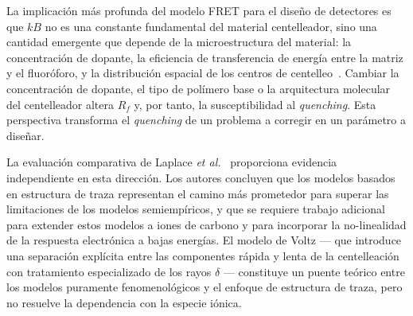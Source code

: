 \documentclass[11pt,a4paper]{article}
\begin{document}
La implicación más profunda del modelo FRET para el diseño de detectores es que $kB$ no es una constante fundamental del material centelleador, sino una cantidad emergente que depende de la microestructura del material: la concentración de dopante, la eficiencia de transferencia de energía entre la matriz y el fluoróforo, y la distribución espacial de los centros de centelleo~\cite{ogawa2018}. Cambiar la concentración de dopante, el tipo de polímero base o la arquitectura molecular del centelleador altera $R_f$ y, por tanto, la susceptibilidad al \textit{quenching}. Esta perspectiva transforma el \textit{quenching} de un problema a corregir en un parámetro a diseñar.

La evaluación comparativa de Laplace \textit{et al.}~\cite{laplace2022} proporciona evidencia independiente en esta dirección. Los autores concluyen que los modelos basados en estructura de traza representan el camino más prometedor para superar las limitaciones de los modelos semiempíricos, y que se requiere trabajo adicional para extender estos modelos a iones de carbono y para incorporar la no-linealidad de la respuesta electrónica a bajas energías. El modelo de Voltz --- que introduce una separación explícita entre las componentes rápida y lenta de la centelleación con tratamiento especializado de los rayos $\delta$ --- constituye un puente teórico entre los modelos puramente fenomenológicos y el enfoque de estructura de traza, pero no resuelve la dependencia con la especie iónica.

\end{document}
